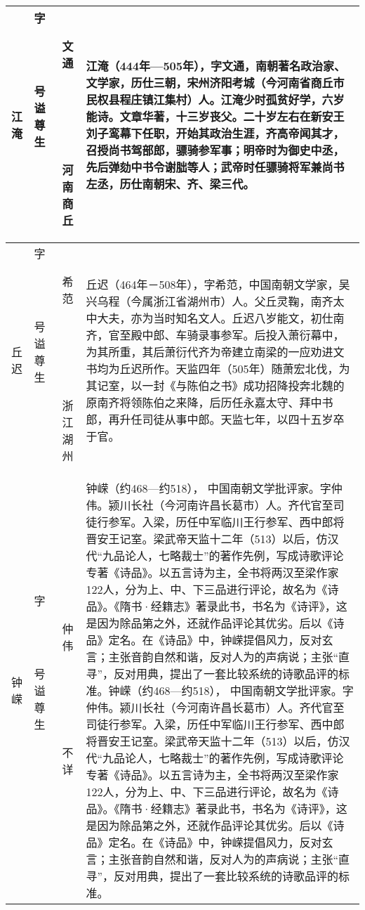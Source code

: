 \begin{longtable}{|>{\centering\namefont\heiti}m{2em}|>{\centering\tiny}m{3.0em}|>{\xzfont\kaiti}m{7.3em}|}
    江淹 & \begin{description}
    \item[字] 文通
    \item[号] 
    \item[谥] 
    \item[尊] 
    \item[生]河南商丘
    \end{description} & 江淹（444年—505年），字文通，南朝著名政治家、文学家，历仕三朝，宋州济阳考城（今河南省商丘市民权县程庄镇江集村）人。江淹少时孤贫好学，六岁能诗。文章华著，十三岁丧父。二十岁左右在新安王刘子鸾幕下任职，开始其政治生涯，齐高帝闻其才，召授尚书驾部郎，骠骑参军事；明帝时为御史中丞，先后弹劾中书令谢朏等人；武帝时任骠骑将军兼尚书左丞，历仕南朝宋、齐、梁三代。 \tabularnewline\hline
    丘迟 & \begin{description}
    \item[字] 希范
    \item[号] 
    \item[谥] 
    \item[尊] 
    \item[生] 浙江湖州
    \end{description} & 丘迟（464年－508年），字希范，中国南朝文学家，吴兴乌程（今属浙江省湖州市）人。父丘灵鞠，南齐太中大夫，亦为当时知名文人。丘迟八岁能文，初仕南齐，官至殿中郎、车骑录事参军。后投入萧衍幕中，为其所重，其后萧衍代齐为帝建立南梁的一应劝进文书均为丘迟所作。天监四年（505年）随萧宏北伐，为其记室，以一封《与陈伯之书》成功招降投奔北魏的原南齐将领陈伯之来降，后历任永嘉太守、拜中书郎，再升任司徒从事中郎。天监七年，以四十五岁卒于官。 \tabularnewline\hline
    钟嵘 & \begin{description}
    \item[字] 仲伟
    \item[号] 
    \item[谥] 
    \item[尊] 
    \item[生] 不详
    \end{description} & 钟嵘（约468—约518）， 中国南朝文学批评家。字仲伟。颍川长社（今河南许昌长葛市）人。齐代官至司徒行参军。入梁，历任中军临川王行参军、西中郎将晋安王记室。梁武帝天监十二年（513）以后，仿汉代“九品论人，七略裁士”的著作先例，写成诗歌评论专著《诗品》。以五言诗为主，全书将两汉至梁作家122人，分为上、中、下三品进行评论，故名为《诗品》。《隋书·经籍志》著录此书，书名为《诗评》，这是因为除品第之外，还就作品评论其优劣。后以《诗品》定名。在《诗品》中，钟嵘提倡风力，反对玄言；主张音韵自然和谐，反对人为的声病说；主张“直寻”，反对用典，提出了一套比较系统的诗歌品评的标准。钟嵘（约468—约518）， 中国南朝文学批评家。字仲伟。颍川长社（今河南许昌长葛市）人。齐代官至司徒行参军。入梁，历任中军临川王行参军、西中郎将晋安王记室。梁武帝天监十二年（513）以后，仿汉代“九品论人，七略裁士”的著作先例，写成诗歌评论专著《诗品》。以五言诗为主，全书将两汉至梁作家122人，分为上、中、下三品进行评论，故名为《诗品》。《隋书·经籍志》著录此书，书名为《诗评》，这是因为除品第之外，还就作品评论其优劣。后以《诗品》定名。在《诗品》中，钟嵘提倡风力，反对玄言；主张音韵自然和谐，反对人为的声病说；主张“直寻”，反对用典，提出了一套比较系统的诗歌品评的标准。 \tabularnewline\hline


\end{longtable}
